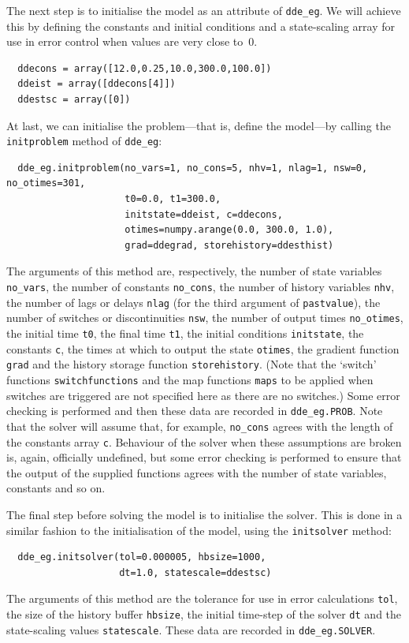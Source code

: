 \documentclass[10pt,a4paper] {article}
\begin{document}
The next step is to initialise the model as an attribute of \verb+dde_eg+.  We will achieve this by defining the constants and initial conditions and a state-scaling array for use in error control when values are very close to~$0$.

\begin{verbatim}
  ddecons = array([12.0,0.25,10.0,300.0,100.0])
  ddeist = array([ddecons[4]])
  ddestsc = array([0])
\end{verbatim}

At last, we can initialise the problem---that is, define the model---by calling the \verb+initproblem+ method of \verb+dde_eg+:
\begin{verbatim}
  dde_eg.initproblem(no_vars=1, no_cons=5, nhv=1, nlag=1, nsw=0, no_otimes=301,
                     t0=0.0, t1=300.0,
                     initstate=ddeist, c=ddecons, 
                     otimes=numpy.arange(0.0, 300.0, 1.0),
                     grad=ddegrad, storehistory=ddesthist)
\end{verbatim}
The arguments of this method are, respectively, the number of state variables \verb+no_vars+, the number of constants \verb+no_cons+, the number of history variables \verb+nhv+, the number of lags or delays \verb+nlag+ (for the third argument of \verb+pastvalue+), the number of switches or discontinuities \verb+nsw+, the number of output times \verb+no_otimes+, the initial time \verb+t0+, the final time \verb+t1+, the initial conditions \verb+initstate+, the constants \verb+c+, the times at which to output the state \verb+otimes+, the gradient function \verb+grad+ and the history storage function \verb+storehistory+.  (Note that the `switch' functions \verb+switchfunctions+ and the map functions \verb+maps+ to be applied when switches are triggered are not specified here as there are no switches.)  Some error checking is performed and then these data are recorded in \verb+dde_eg.PROB+.  Note that the solver will assume that, for example, \verb+no_cons+ agrees with the length of the constants array \verb+c+.  Behaviour of the solver when these assumptions are broken is, again, officially undefined, but some error checking is performed to ensure that the output of the supplied functions agrees with the number of state variables, constants and so on.  

The final step before solving the model is to initialise the solver.  This is done in a similar fashion to the initialisation of the model, using the \verb+initsolver+ method:
\begin{verbatim}
  dde_eg.initsolver(tol=0.000005, hbsize=1000,
                    dt=1.0, statescale=ddestsc)
\end{verbatim}
The arguments of this method are the tolerance for use in error calculations \verb+tol+, the size of the history buffer \verb+hbsize+, the initial time-step of the solver \verb+dt+ and the state-scaling values \verb+statescale+.  These data are recorded in \verb+dde_eg.SOLVER+.
\end{document}
